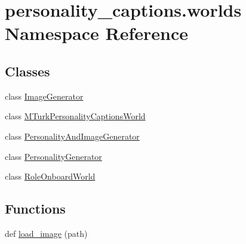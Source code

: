 \hypertarget{namespacepersonality__captions_1_1worlds}{}\section{personality\+\_\+captions.\+worlds Namespace Reference}
\label{namespacepersonality__captions_1_1worlds}
\subsection*{Classes}
\begin{DoxyCompactItemize}
\item 
class \hyperlink{classpersonality__captions_1_1worlds_1_1ImageGenerator}{Image\+Generator}
\item 
class \hyperlink{classpersonality__captions_1_1worlds_1_1MTurkPersonalityCaptionsWorld}{M\+Turk\+Personality\+Captions\+World}
\item 
class \hyperlink{classpersonality__captions_1_1worlds_1_1PersonalityAndImageGenerator}{Personality\+And\+Image\+Generator}
\item 
class \hyperlink{classpersonality__captions_1_1worlds_1_1PersonalityGenerator}{Personality\+Generator}
\item 
class \hyperlink{classpersonality__captions_1_1worlds_1_1RoleOnboardWorld}{Role\+Onboard\+World}
\end{DoxyCompactItemize}
\subsection*{Functions}
\begin{DoxyCompactItemize}
\item 
def \hyperlink{namespacepersonality__captions_1_1worlds_a2863737d97a8e8c5a1ebe9029d0d2293}{load\+\_\+image} (path)
\end{DoxyCompactItemize}
